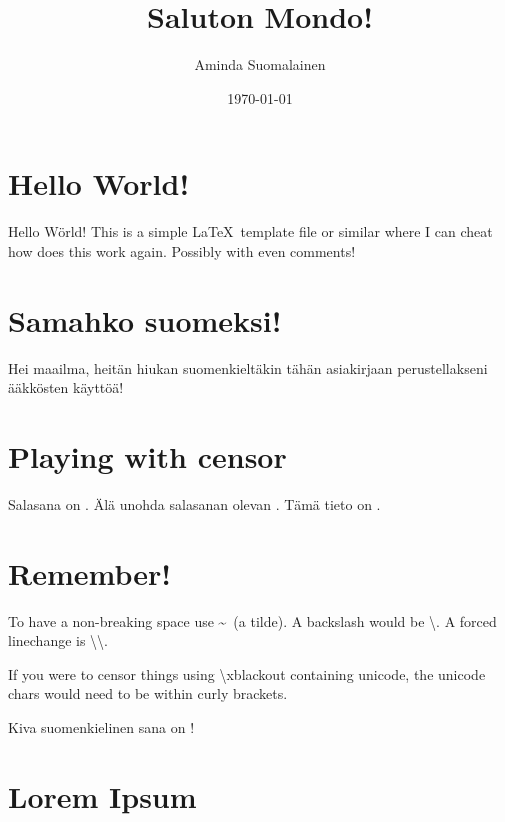 \documentclass[a4paper]{artikel3}
\title{Saluton Mondo!}
\author{Aminda Suomalainen}
\date{\today}
\begin{document}
\maketitle


\section*{Hello World!}

Hello Wörld! This is a simple \LaTeX\ template file or similar where I can cheat how does this work again.
Possibly with even comments!


\section*{Samahko suomeksi!}

Hei maailma, heitän hiukan suomenkieltäkin tähän asiakirjaan perustellakseni ääkkösten käyttöä!


\section*{Playing with censor}


\def \Password{\censor*{8}}
\def \Huippusalainen{\censor*{14}}

Salasana on \Password.
Älä unohda salasanan olevan \Password.
Tämä tieto on \Huippusalainen.


\section*{Remember!}

To have a non-breaking space use \textasciitilde\ (a tilde).
A backslash would be \textbackslash.
A forced linechange is \textbackslash\textbackslash.

If you were to censor things using \textbackslash xblackout containing unicode, the unicode chars would need to be within curly brackets.


Kiva suomenkielinen sana on !


\section*{Lorem Ipsum}


\end{document}

